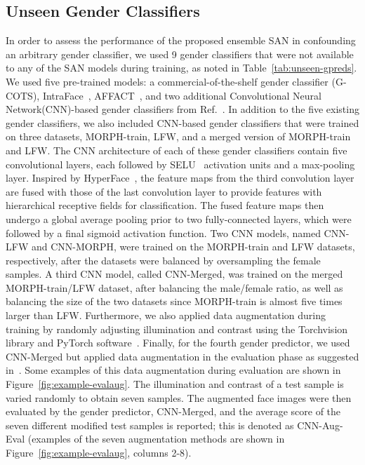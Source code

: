\documentclass[10pt,twocolumn,letterpaper]{article}
\begin{document}
\subsection{Unseen Gender Classifiers}
In order to assess the performance of the proposed ensemble SAN in confounding an arbitrary gender classifier, we used 9 gender classifiers that were not available to any of the SAN models during training, as noted in Table~\ref{tab:unseen-gpreds}. We used five pre-trained models: a commercial-of-the-shelf gender classifier (G-COTS), IntraFace~\cite{de_la_torre_intraface_2015_long}, AFFACT~\cite{gunther_affact_2016}, and two additional Convolutional Neural Network(CNN)-based gender classifiers from Ref.~\cite{arriaga_real_2017}. In addition to the five existing gender classifiers, we also included CNN-based gender classifiers that were trained on three datasets, MORPH-train, LFW, and a merged version of MORPH-train and LFW. The CNN architecture of each of these gender classifiers contain five convolutional layers, each followed by SELU~\cite{klambauer_self_2017} activation units and a max-pooling layer. Inspired by HyperFace~\cite{ranjan_hyperface_2017}, the feature maps from the third convolution layer are fused with those of the last convolution layer to provide  features with hierarchical receptive fields for classification. The fused feature maps then undergo a global average pooling prior to two fully-connected layers, which were followed by a final sigmoid activation function. Two CNN models, named CNN-LFW and CNN-MORPH, were trained on the MORPH-train and LFW datasets, respectively, after the datasets were balanced by oversampling the female samples. A third CNN model, called CNN-Merged, was trained on the merged MORPH-train/LFW dataset, after balancing the male/female ratio, as well as balancing the size of the two datasets since MORPH-train is almost five times larger than LFW. Furthermore, we  also applied data augmentation during training by randomly adjusting illumination and contrast using the Torchvision library and PyTorch software~\cite{paszke_automatic_2017}. Finally, for the fourth gender predictor, we used CNN-Merged but applied data augmentation in the evaluation phase as suggested in~\cite{gunther_affact_2016}. Some examples of this data augmentation during evaluation are shown in Figure~\ref{fig:example-evalaug}. The illumination and contrast of a test sample is varied randomly to obtain seven samples. The augmented face images were then evaluated by the gender predictor, CNN-Merged, and the average score of the seven different modified test samples is reported; this is denoted as CNN-Aug-Eval (examples of the seven augmentation methods are shown in Figure~\ref{fig:example-evalaug}, columns 2-8).
\end{document}
